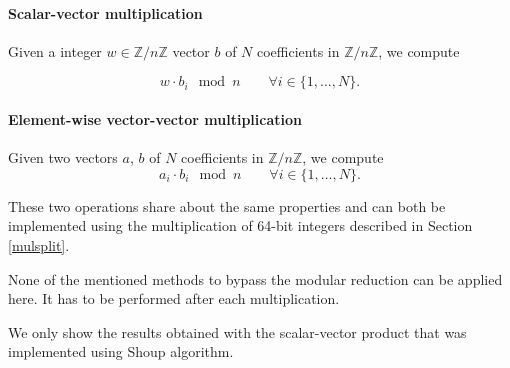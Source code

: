 \documentclass[a4paper]{article}
\begin{document}
\paragraph{Scalar-vector multiplication} Given a integer $w \in \mathbb{Z}/n\mathbb{Z}$ vector $b$ of $N$ coefficients in $\mathbb{Z}/n\mathbb{Z}$, we compute

\[
w \cdot b_i \mod n \qquad \forall i\in \{1,\dots,N\}.
\]

\paragraph{Element-wise vector-vector multiplication} Given two vectors $a$, $b$ of $N$ coefficients in $\mathbb{Z}/n\mathbb{Z}$, we compute
\[
a_i \cdot b_i \mod n \qquad \forall i\in \{1,\dots,N\}.
\]

\bigskip
These two operations share about the same properties and can both be implemented using the multiplication of 64-bit integers described 
in Section \ref{mulsplit}.

\begin{remark}
    None of the mentioned methods to bypass the modular reduction can be applied here. It has to be performed after each multiplication.
\end{remark}

We only show the results obtained with the scalar-vector product that was implemented using Shoup algorithm.
\end{document}
